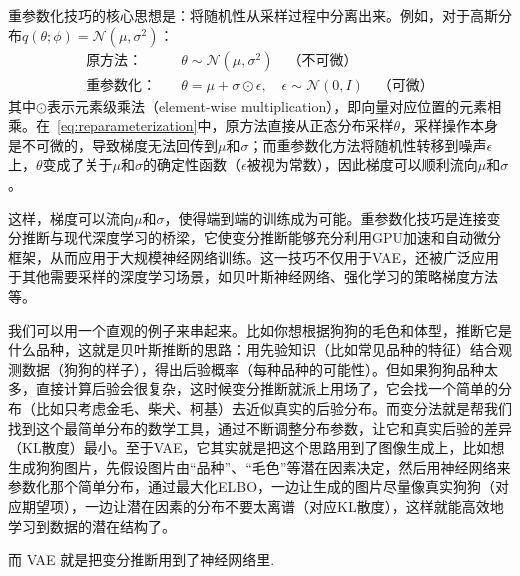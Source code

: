 重参数化技巧的核心思想是：将随机性从采样过程中分离出来。例如，对于高斯分布$q(\theta;\phi) = \mathcal{N}(\mu, \sigma^2)$：
\begin{align}\label{eq:reparameterization}
\text{原方法}：&\quad \theta \sim \mathcal{N}(\mu, \sigma^2) \quad \text{（不可微）} \\
\text{重参数化}：&\quad \theta = \mu + \sigma \odot \epsilon, \quad \epsilon \sim \mathcal{N}(0, I) \quad \text{（可微）}
\end{align}
其中$\odot$表示元素级乘法（element-wise multiplication），即向量对应位置的元素相乘。在~\eqref{eq:reparameterization}中，原方法直接从正态分布采样$\theta$，采样操作本身是不可微的，导致梯度无法回传到$\mu$和$\sigma$；而重参数化方法将随机性转移到噪声$\epsilon$上，$\theta$变成了关于$\mu$和$\sigma$的确定性函数（$\epsilon$被视为常数），因此梯度可以顺利流向$\mu$和$\sigma$。

这样，梯度可以流向$\mu$和$\sigma$，使得端到端的训练成为可能。重参数化技巧是连接变分推断与现代深度学习的桥梁，它使变分推断能够充分利用GPU加速和自动微分框架，从而应用于大规模神经网络训练。这一技巧不仅用于VAE，还被广泛应用于其他需要采样的深度学习场景，如贝叶斯神经网络、强化学习的策略梯度方法等。

我们可以用一个直观的例子来串起来。比如你想根据狗狗的毛色和体型，推断它是什么品种，这就是贝叶斯推断的思路：用先验知识（比如常见品种的特征）结合观测数据（狗狗的样子），得出后验概率（每种品种的可能性）。但如果狗狗品种太多，直接计算后验会很复杂，这时候变分推断就派上用场了，它会找一个简单的分布（比如只考虑金毛、柴犬、柯基）去近似真实的后验分布。而变分法就是帮我们找到这个最简单分布的数学工具，通过不断调整分布参数，让它和真实后验的差异（KL散度）最小。至于VAE，它其实就是把这个思路用到了图像生成上，比如想生成狗狗图片，先假设图片由“品种”、“毛色”等潜在因素决定，然后用神经网络来参数化那个简单分布，通过最大化ELBO，一边让生成的图片尽量像真实狗狗（对应期望项），一边让潜在因素的分布不要太离谱（对应KL散度），这样就能高效地学习到数据的潜在结构了。

而 VAE 就是把变分推断用到了神经网络里.


